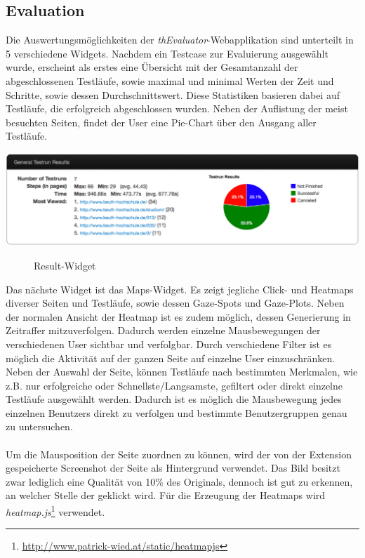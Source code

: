 \subsection{Evaluation}
\label{evaluation}

Die Auswertungsmöglichkeiten der \textit{thEvaluator}-Webapplikation sind unterteilt in 5 verschiedene Widgets. Nachdem ein Testcase zur Evaluierung ausgewählt wurde, erscheint als erstes eine Übersicht mit der Gesamtanzahl der abgeschlossenen Testläufe, sowie maximal und minimal Werten der Zeit und Schritte, sowie dessen Durchschnittswert. Diese Statistiken basieren dabei auf Testläufe, die erfolgreich abgeschlossen wurden. Neben der Auflistung der meist besuchten Seiten, findet der User eine Pie-Chart über den Ausgang aller Testläufe.
\\
\begin{center}
\includegraphics[scale=0.45]{./images/resultWidget}
\end{center}
\begin{figure}[htb]
   \centering
   \caption{Result-Widget}
    \label{resultWidget}
\end{figure}

Das nächste Widget ist das Maps-Widget. Es zeigt jegliche Click- und Heatmaps diverser Seiten und Testläufe, sowie dessen Gaze-Spots und Gaze-Plots. Neben der normalen Ansicht der Heatmap ist es zudem möglich, dessen Generierung in Zeitraffer mitzuverfolgen. Dadurch werden einzelne Mausbewegungen der verschiedenen User sichtbar und verfolgbar. Durch verschiedene Filter ist es möglich die Aktivität auf der ganzen Seite auf einzelne User einzuschränken. Neben der Auswahl der Seite, können Testläufe nach bestimmten Merkmalen, wie z.B. \glqq nur erfolgreiche\grqq{} oder \glqq Schnellste\grqq{}/\glqq Langsamste\grqq{}, gefiltert oder direkt einzelne Testläufe ausgewählt werden. Dadurch ist es möglich die Mausbewegung jedes einzelnen Benutzers direkt zu verfolgen und bestimmte Benutzergruppen genau zu untersuchen.\\
\\
Um die Mausposition der Seite zuordnen zu können, wird der von der Extension gespeicherte Screenshot der Seite als Hintergrund verwendet. Das Bild besitzt zwar lediglich eine Qualität von 10\% des Originals, dennoch ist gut zu erkennen, an welcher Stelle der geklickt wird. Für die Erzeugung der Heatmaps wird \textit{heatmap.js}\footnote{\url{http://www.patrick-wied.at/static/heatmapjs}} verwendet.

